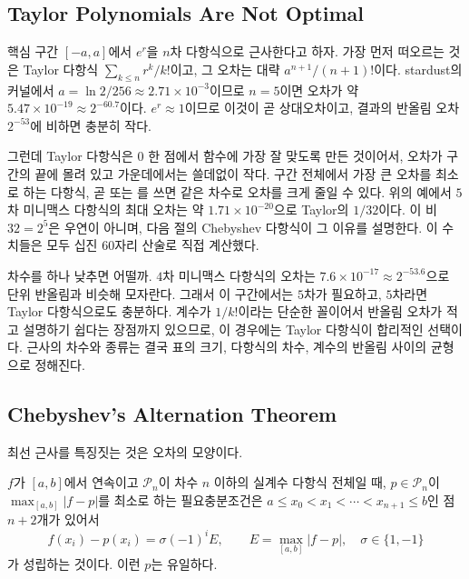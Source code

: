 \subsection{Taylor Polynomials Are Not Optimal}

핵심 구간 $[-a,a]$에서 $e^r$을 $n$차 다항식으로 근사한다고 하자. 가장 먼저 떠오르는 것은 Taylor 다항식 $\sum_{k\le n}r^k/k!$이고, 그 오차는 대략 $a^{n+1}/(n+1)!$이다. stardust의  커널에서 $a=\ln2/256\approx2.71\times10^{-3}$이므로 $n=5$이면 오차가 약 $5.47\times10^{-19}\approx2^{-60.7}$이다. $e^r\approx1$이므로 이것이 곧 상대오차이고, 결과의 반올림 오차 $2^{-53}$에 비하면 충분히 작다.

그런데 Taylor 다항식은 $0$ 한 점에서 함수에 가장 잘 맞도록 만든 것이어서, 오차가 구간의 끝에 몰려 있고 가운데에서는 쓸데없이 작다. 구간 전체에서 가장 큰 오차를 최소로 하는 다항식, 곧  또는 를 쓰면 같은 차수로 오차를 크게 줄일 수 있다. 위의 예에서 $5$차 미니맥스 다항식의 최대 오차는 약 $1.71\times10^{-20}$으로 Taylor의 $1/32$이다. 이 비 $32=2^5$은 우연이 아니며, 다음 절의 Chebyshev 다항식이 그 이유를 설명한다. 이 수치들은 모두 십진 $60$자리 산술로 직접 계산했다.

차수를 하나 낮추면 어떨까. $4$차 미니맥스 다항식의 오차는 $7.6\times10^{-17}\approx2^{-53.6}$으로 단위 반올림과 비슷해 모자란다. 그래서 이 구간에서는 $5$차가 필요하고, $5$차라면 Taylor 다항식으로도 충분하다. 계수가 $1/k!$이라는 단순한 꼴이어서 반올림 오차가 적고 설명하기 쉽다는 장점까지 있으므로, 이 경우에는 Taylor 다항식이 합리적인 선택이다. 근사의 차수와 종류는 결국 표의 크기, 다항식의 차수, 계수의 반올림 사이의 균형으로 정해진다.

\subsection{Chebyshev's Alternation Theorem}

최선 근사를 특징짓는 것은 오차의 모양이다.

\begin{theorem}[Chebyshev의 교대 정리]
\label{thm:equioscillation}
$f$가 $[a,b]$에서 연속이고 $\mathcal P_n$이 차수 $n$ 이하의 실계수 다항식 전체일 때, $p\in\mathcal P_n$이 $\max_{[a,b]}|f-p|$를 최소로 하는 필요충분조건은 $a\le x_0<x_1<\cdots<x_{n+1}\le b$인 점 $n+2$개가 있어서
\[
f(x_i)-p(x_i)=\sigma(-1)^iE,\qquad E=\max_{[a,b]}|f-p|,\quad\sigma\in\{1,-1\}
\]
가 성립하는 것이다. 이런 $p$는 유일하다.
\end{theorem}

